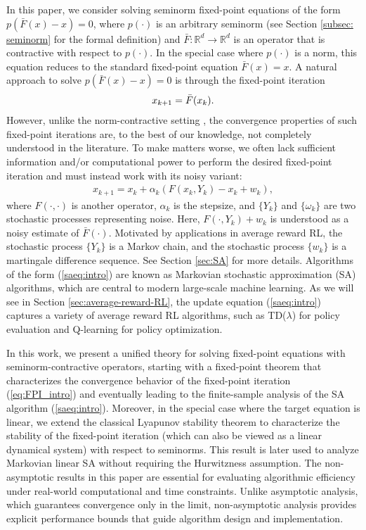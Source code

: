 \documentclass[11 pt]{article}
\begin{document}
	
	In this paper, we consider solving seminorm fixed-point equations of the form $ p(\bar{F}(x) - x) = 0 $, where $ p(\cdot) $ is an arbitrary seminorm (see Section \ref{subsec: seminorm} for the formal definition) and $ \bar{F}: \mathbb{R}^d \to \mathbb{R}^d $ is an operator that is contractive with respect to $ p(\cdot) $. In the special case where $ p(\cdot) $ is a norm, this equation reduces to the standard fixed-point equation $ \bar{F}(x) = x $. A natural approach to solve $ p(\bar{F}(x) - x) = 0 $ is through the fixed-point iteration
	\begin{align}\label{eq:FPI_intro}
		x_{k+1} = \Bar{F}(x_k).
	\end{align} 
	However, unlike the norm-contractive setting \cite{banach1922operations}, the convergence properties of such fixed-point iterations are, to the best of our knowledge, not completely understood in the literature. To make matters worse, we often lack sufficient information and/or computational power to perform the desired fixed-point iteration and must instead work with its noisy variant:
	\begin{align}\label{saeq:intro}
		x_{k+1} = x_k + \alpha_k (F(x_k, Y_k) - x_k + w_k),
	\end{align}
	where $ F(\cdot, \cdot) $ is another operator, $ \alpha_k $ is the stepsize, and $ \{Y_k\} $ and $ \{\omega_k\} $ are two stochastic processes representing noise. Here, $F(\cdot,Y_k)+w_k$ is understood as a noisy estimate of $\bar{F}(\cdot)$. Motivated by applications in average reward RL, the stochastic process $\{Y_k\}$ is a Markov chain, and the stochastic process $\{w_k\}$ is a martingale difference sequence. See Section \ref{sec:SA} for more details.  Algorithms of the form (\ref{saeq:intro}) are known as Markovian stochastic approximation (SA) algorithms, which are central to modern large-scale machine learning. As we will see in Section \ref{sec:average-reward-RL}, the update equation (\ref{saeq:intro}) captures a variety of average reward RL algorithms, such as TD($\lambda$) for policy evaluation and Q-learning for policy optimization.
	
	In this work, we present a unified theory for solving fixed-point equations with seminorm-contractive operators, starting with a fixed-point theorem that characterizes the convergence behavior of the fixed-point iteration (\ref{eq:FPI_intro}) and eventually leading to the finite-sample analysis of the SA algorithm (\ref{saeq:intro}). Moreover, in the special case where the target equation is linear, we extend the classical Lyapunov stability theorem to characterize the stability of the fixed-point iteration (which can also be viewed as a linear dynamical system) with respect to seminorms. This result is later used to analyze Markovian linear SA without requiring the Hurwitzness assumption. The non-asymptotic results in this paper are essential for evaluating algorithmic efficiency under real-world computational and time constraints. Unlike asymptotic analysis, which guarantees convergence only in the limit, non-asymptotic analysis provides explicit performance bounds that guide algorithm design and implementation.
	
\end{document}
